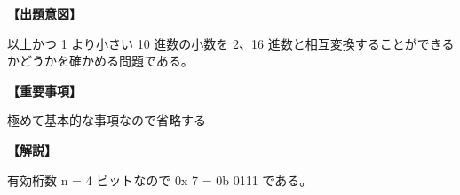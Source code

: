 \noindent \textbf{【出題意図】}

 以上かつ 1 より小さい 10 進数の小数を 2、16 進数と相互変換することができるかどうかを確かめる問題である。

\vspace{1em}
\noindent \textbf{【重要事項】}

\noindent 極めて基本的な事項なので省略する

\vspace{1em}
\noindent \textbf{【解説】}

\noindent 有効桁数 n = 4 ビットなので 0x 7 = 0b 0111 である。
